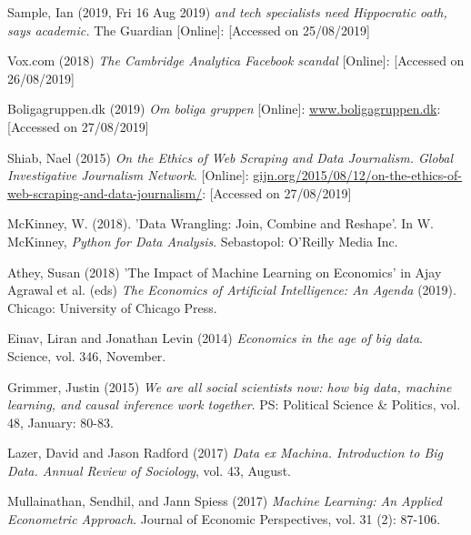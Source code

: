 \documentclass[12pt,a4paper]{article}
\begin{document}
Sample, Ian (2019, Fri 16 Aug 2019) \textit{and tech specialists need Hippocratic oath, says academic.} The Guardian [Online]: \href{https://www.theguardian.com/science/2019/aug/16/mathematicians-need-doctor-style-hippocratic-oath-says-academic-hannah-fry} [Accessed on 25/08/2019]\newline

Vox.com (2018) \textit{The Cambridge Analytica Facebook scandal} [Online]: \href{https://www.vox.com/2018/4/10/17207394/cambridge-analytica-facebook-zuckerberg-trump-privacy-scandal} [Accessed on 26/08/2019] \newline
 
Boligagruppen.dk (2019) \textit{Om boliga gruppen} [Online]: \href{https://www.boligagruppen.dk}{www.boligagruppen.dk}: [Accessed on 27/08/2019] \newline

Shiab, Nael (2015) \textit{On the Ethics of Web Scraping and Data Journalism. Global Investigative Journalism Network.} [Online]: \href{https://gijn.org/2015/08/12/on-the-ethics-of-web-scraping-and-data-journalism/}{gijn.org/2015/08/12/on-the-ethics-of-web-scraping-and-data-journalism/}: [Accessed on 27/08/2019] \newline

McKinney, W. (2018). 'Data Wrangling: Join, Combine and Reshape'. In W. McKinney, \textit{Python for Data Analysis}. Sebastopol: O'Reilly Media Inc. \newline

Athey, Susan (2018) 'The Impact of Machine Learning on Economics' in Ajay Agrawal et al. (eds) \textit{The Economics of Artificial Intelligence: An Agenda} (2019). Chicago: University of Chicago Press. \newline

Einav, Liran and Jonathan Levin (2014) \textit{Economics in the age of big data}. Science, vol. 346, November. \newline

Grimmer, Justin (2015) \textit{We are all social scientists now: how big data, machine learning, and causal inference work together}. PS: Political Science \& Politics, vol. 48, January: 80-83. \newline

Lazer, David and Jason Radford (2017) \textit{Data ex Machina. Introduction to Big Data. Annual Review of Sociology}, vol. 43, August. \newline

Mullainathan, Sendhil, and Jann Spiess (2017) \textit{Machine Learning: An Applied Econometric Approach}. Journal of Economic Perspectives, vol. 31 (2): 87-106. \newline
\end{document}
